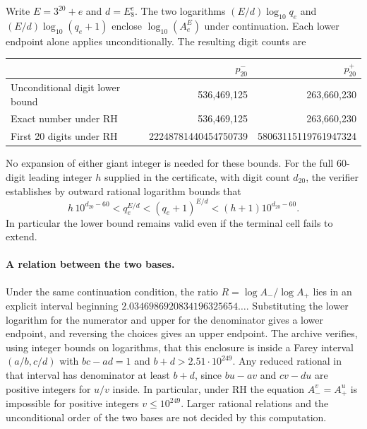 \documentclass[11pt]{article}
\begin{document}
Write $E=3^{20}+e$ and $d=E_8^e$. The two logarithms $(E/d)\log_{10}q_e$ and $(E/d)\log_{10}(q_e+1)$ enclose $\log_{10}(A_e^E)$ under continuation. Each lower endpoint alone applies unconditionally. The resulting digit counts are
\begin{center}
\begin{tabular}{lrr}
\toprule
 & $p_{20}^{-}$ & $p_{20}^{+}$\\
\midrule
Unconditional digit lower bound & 536,469,125 & 263,660,230\\
Exact number under RH & 536,469,125 & 263,660,230\\
First 20 digits under RH & 22248781440454750739 & 58063115119761947324\\
\bottomrule
\end{tabular}
\end{center}
No expansion of either giant integer is needed for these bounds. For the full 60-digit leading integer $h$ supplied in the certificate, with digit count $d_{20}$, the verifier establishes by outward rational logarithm bounds that
\[
 h\,10^{d_{20}-60}<q_e^{E/d}<(q_e+1)^{E/d}
                 <(h+1)10^{d_{20}-60}.
\]
In particular the lower bound remains valid even if the terminal cell fails to extend.

\paragraph{A relation between the two bases.}
Under the same continuation condition, the ratio $R=\log A_-/\log A_+$ lies in an explicit interval beginning $2.0346986920834196325654\ldots$. Substituting the lower logarithm for the numerator and upper for the denominator gives a lower endpoint, and reversing the choices gives an upper endpoint. The archive verifies, using integer bounds on logarithms, that this enclosure is inside a Farey interval $(a/b,c/d)$ with $bc-ad=1$ and $b+d>2.51\cdot10^{249}$. Any reduced rational in that interval has denominator at least $b+d$, since $bu-av$ and $cv-du$ are positive integers for $u/v$ inside. In particular, under RH the equation $A_-^v=A_+^u$ is impossible for positive integers $v\le 10^{249}$. Larger rational relations and the unconditional order of the two bases are not decided by this computation.
\end{document}
